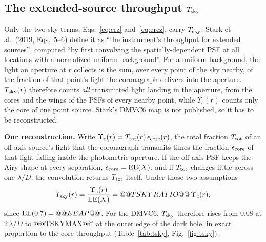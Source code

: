 \documentclass[11pt,a4paper]{article}
\begin{document}
\subsection{The extended-source throughput $T_{\rm sky}$}
\label{sec:tsky}

Only the two sky terms, Eqs.~\eqref{eq:crz} and~\eqref{eq:crez}, carry $T_{\rm sky}$. Stark et
al.\ (2019, Eqs.~5--6) define it as ``the instrument's throughput for extended sources'',
computed ``by first convolving the spatially-dependent PSF at all locations with a normalized
uniform background''. For a uniform background, the light an aperture at $r$ collects is the sum,
over every point of the sky nearby, of the fraction of that point's light the coronagraph
delivers into the aperture. $T_{\rm sky}(r)$ therefore counts \emph{all} transmitted light
landing in the aperture, from the cores and the wings of the PSFs of every nearby point, while
$\Upsilon_c(r)$ counts only the core of one point source. Stark's DMVC6 map is not published, so
it has to be reconstructed.

\textbf{Our reconstruction.} Write $\Upsilon_c(r) = T_{\rm tot}(r)\,\epsilon_{\rm core}(r)$, the
total fraction $T_{\rm tot}$ of an off-axis source's light that the coronagraph transmits times
the fraction $\epsilon_{\rm core}$ of that light falling inside the photometric aperture. If the
off-axis PSF keeps the Airy shape at every separation, $\epsilon_{\rm core} = {\rm EE}(X)$, and if
$T_{\rm tot}$ changes little across one $\lambda/D$, the convolution returns $T_{\rm tot}$ itself.
Under those two assumptions
\begin{equation}
T_{\rm sky}(r) = \frac{\Upsilon_c(r)}{{\rm EE}(X)} = @@TSKYRATIO@@\,\Upsilon_c(r),
\label{eq:tsky}
\end{equation}
since ${\rm EE}(0.7) = @@EEAP@@$. For the DMVC6, $T_{\rm sky}$ therefore rises from 0.08 at
$2\,\lambda/D$ to @@TSKYMAX@@ at the outer edge of the dark hole, in exact proportion to the core
throughput (Table~\ref{tab:tsky}, Fig.~\ref{fig:tsky}).
\end{document}
